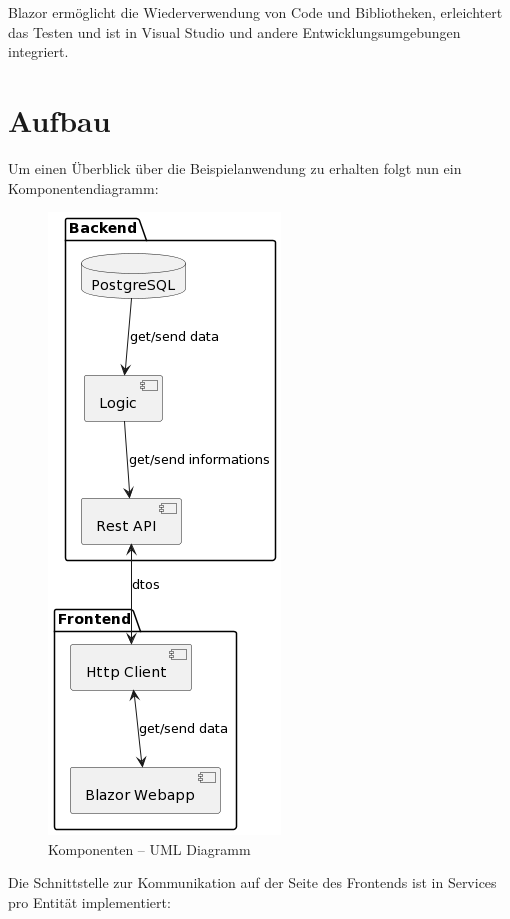 Blazor ermöglicht die Wiederverwendung von Code und Bibliotheken, erleichtert das Testen und ist in Visual Studio und andere Entwicklungsumgebungen integriert.
\newpage
\section{Aufbau}

Um einen Überblick über die Beispielanwendung zu erhalten folgt nun ein Komponentendiagramm:

\begin{figure}[H]
    \centering
    \includegraphics[scale=0.5]{pics/KomponentenDiagramm.png}
    \caption{Komponenten -- UML Diagramm}
    \label{fig:impl:KomponentenDiagramm}
\end{figure}

Die Schnittstelle zur Kommunikation auf der Seite des Frontends ist in Services pro Entität implementiert:

